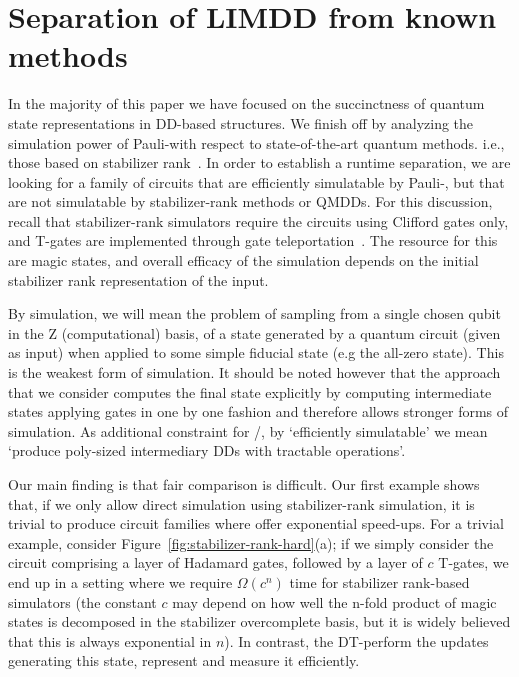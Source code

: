 \section{Separation of LIMDD from known methods}
\label{sec:separation-discussion}

In the majority of this paper we have focused on the succinctness of quantum state representations in DD-based structures.
We finish off by analyzing the simulation power of Pauli-\limdds with respect to state-of-the-art quantum methods. i.e., those based on stabilizer rank~\cite{bravyi2019simulation}.
In order to establish a runtime separation, we are looking for a family of circuits that are efficiently simulatable by Pauli-\limdds, but that are not simulatable by stabilizer-rank methods or QMDDs.
For this discussion, recall that stabilizer-rank simulators require the circuits using Clifford gates only, and T-gates are implemented through gate teleportation~\cite{bravyi2019simulation}.
The resource for this are magic states, and overall efficacy of the simulation depends on the initial stabilizer rank representation of the input.

By simulation, we will mean the problem of sampling from a single chosen qubit in the Z (computational) basis, of a state generated by a quantum circuit (given as input) when applied to some simple fiducial state (e.g the all-zero state).
This is the weakest form of simulation. It should be noted however that the \limdd approach that we consider computes the final state explicitly by computing intermediate states applying gates in one by one fashion and therefore allows stronger forms of simulation. 
As additional constraint for \limdd/\qmdd, by `efficiently simulatable' we mean `produce poly-sized intermediary DDs with tractable operations'.

Our main finding is that fair comparison is difficult.
Our first example shows that, if we only allow direct simulation using stabilizer-rank simulation, it is trivial to produce circuit families where \limdds offer exponential speed-ups.
For a trivial example, consider Figure~\ref{fig:stabilizer-rank-hard}(a); if we simply consider the circuit comprising a layer of Hadamard gates, followed by a layer of $c$ T-gates, we end up in a setting where we require $\Omega(c^n)$ time for stabilizer rank-based simulators (the constant $c$ may depend on how well the n-fold product of magic states is decomposed in the stabilizer overcomplete basis, but it is widely believed that this is always exponential in $n$).
In contrast, the DT-\limdds perform the updates generating this state, represent and measure it efficiently. 

